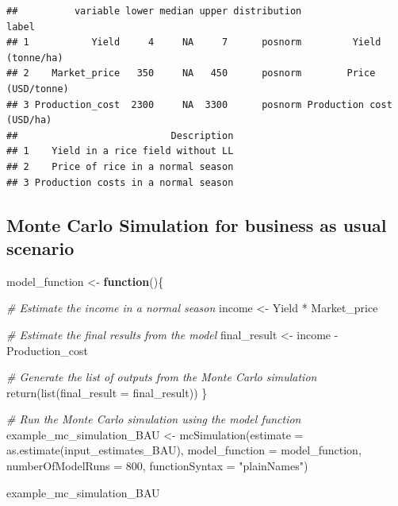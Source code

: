 \documentclass[
]{article}
\newenvironment{Shaded}{\begin{snugshade}}{\end{snugshade}}
\newcommand{\AttributeTok}[1]{\textcolor[rgb]{0.77,0.63,0.00}{#1}}
\newcommand{\CommentTok}[1]{\textcolor[rgb]{0.56,0.35,0.01}{\textit{#1}}}
\newcommand{\ControlFlowTok}[1]{\textcolor[rgb]{0.13,0.29,0.53}{\textbf{#1}}}
\newcommand{\DecValTok}[1]{\textcolor[rgb]{0.00,0.00,0.81}{#1}}
\newcommand{\FunctionTok}[1]{\textcolor[rgb]{0.00,0.00,0.00}{#1}}
\newcommand{\NormalTok}[1]{#1}
\newcommand{\OtherTok}[1]{\textcolor[rgb]{0.56,0.35,0.01}{#1}}
\newcommand{\SpecialCharTok}[1]{\textcolor[rgb]{0.00,0.00,0.00}{#1}}
\newcommand{\StringTok}[1]{\textcolor[rgb]{0.31,0.60,0.02}{#1}}
\begin{document}
\begin{verbatim}
##          variable lower median upper distribution                    label
## 1           Yield     4     NA     7      posnorm         Yield (tonne/ha)
## 2    Market_price   350     NA   450      posnorm        Price (USD/tonne)
## 3 Production_cost  2300     NA  3300      posnorm Production cost (USD/ha)
##                           Description
## 1    Yield in a rice field without LL
## 2    Price of rice in a normal season
## 3 Production costs in a normal season
\end{verbatim}

\hypertarget{monte-carlo-simulation-for-business-as-usual-scenario}{%
\subsection{Monte Carlo Simulation for business as usual
scenario}\label{monte-carlo-simulation-for-business-as-usual-scenario}}

\begin{Shaded}
\begin{Highlighting}[]
\NormalTok{model\_function }\OtherTok{\textless{}{-}} \ControlFlowTok{function}\NormalTok{()\{}
  
  \CommentTok{\# Estimate the income in a normal season}
\NormalTok{  income }\OtherTok{\textless{}{-}}\NormalTok{ Yield }\SpecialCharTok{*}\NormalTok{ Market\_price}
  
  \CommentTok{\# Estimate the final results from the model}
\NormalTok{  final\_result }\OtherTok{\textless{}{-}}\NormalTok{ income }\SpecialCharTok{{-}}\NormalTok{ Production\_cost}
  
  \CommentTok{\# Generate the list of outputs from the Monte Carlo simulation}
  \FunctionTok{return}\NormalTok{(}\FunctionTok{list}\NormalTok{(}\AttributeTok{final\_result =}\NormalTok{ final\_result))}
\NormalTok{\}}

\CommentTok{\# Run the Monte Carlo simulation using the model function}
\NormalTok{example\_mc\_simulation\_BAU }\OtherTok{\textless{}{-}} \FunctionTok{mcSimulation}\NormalTok{(}\AttributeTok{estimate =} \FunctionTok{as.estimate}\NormalTok{(input\_estimates\_BAU),}
                              \AttributeTok{model\_function =}\NormalTok{ model\_function,}
                              \AttributeTok{numberOfModelRuns =} \DecValTok{800}\NormalTok{,}
                              \AttributeTok{functionSyntax =} \StringTok{"plainNames"}\NormalTok{)}

\NormalTok{example\_mc\_simulation\_BAU}
\end{Highlighting}
\end{Shaded}
\end{document}
